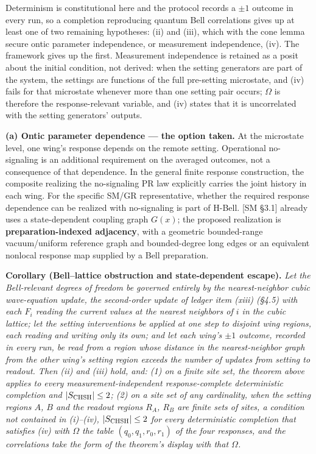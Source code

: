 \documentclass[
]{article}
\begin{document}
Determinism is constitutional here and the protocol records a \(\pm1\)
outcome in every run, so a completion reproducing quantum Bell
correlations gives up at least one of two remaining hypotheses: (ii) and
(iii), which with the cone lemma secure ontic parameter independence, or
measurement independence, (iv). The framework gives up the first.
Measurement independence is retained as a posit about the initial
condition, not derived: when the setting generators are part of the
system, the settings are functions of the full pre-setting microstate,
and (iv) fails for that microstate whenever more than one setting pair
occurs; \(\Omega\) is therefore the response-relevant variable, and (iv)
states that it is uncorrelated with the setting generators' outputs.

\textbf{(a) Ontic parameter dependence --- the option taken.} At the
microstate level, one wing's response depends on the remote setting.
Operational no-signaling is an additional requirement on the averaged
outcomes, not a consequence of that dependence. In the general finite
response construction, the composite realizing the no-signaling PR law
explicitly carries the joint history in each wing. For the specific
SM/GR representative, whether the required response dependence can be
realized with no-signaling is part of H-Bell. {[}SM §3.1{]} already uses
a state-dependent coupling graph \(G(x)\); the proposed realization is
\textbf{preparation-indexed adjacency}, with a geometric bounded-range
vacuum/uniform reference graph and bounded-degree long edges or an
equivalent nonlocal response map supplied by a Bell preparation.

\textbf{Corollary (Bell--lattice obstruction and state-dependent
escape).} \emph{Let the Bell-relevant degrees of freedom be governed
entirely by the nearest-neighbor cubic wave-equation update, the
second-order update of ledger item (xiii) (§4.5) with each \(F_i\)
reading the current values at the nearest neighbors of \(i\) in the
cubic lattice; let the setting interventions be applied at one step to
disjoint wing regions, each reading and writing only its own; and let
each wing's \(\pm1\) outcome, recorded in every run, be read from a
region whose distance in the nearest-neighbor graph from the other
wing's setting region exceeds the number of updates from setting to
readout. Then (ii) and (iii) hold, and: (1) on a finite site set, the
theorem above applies to every measurement-independent response-complete
deterministic completion and \(|S_{\rm CHSH}|\le2\); (2) on a site set
of any cardinality, when the setting regions \(A\), \(B\) and the
readout regions \(R_A\), \(R_B\) are finite sets of sites, a condition
not contained in (i)--(iv), \(|S_{\rm CHSH}|\le2\) for every
deterministic completion that satisfies (iv) with \(\Omega\) the table
\((q_0,q_1,r_0,r_1)\) of the four responses, and the correlations take
the form of the theorem's display with that \(\Omega\).}
\end{document}
